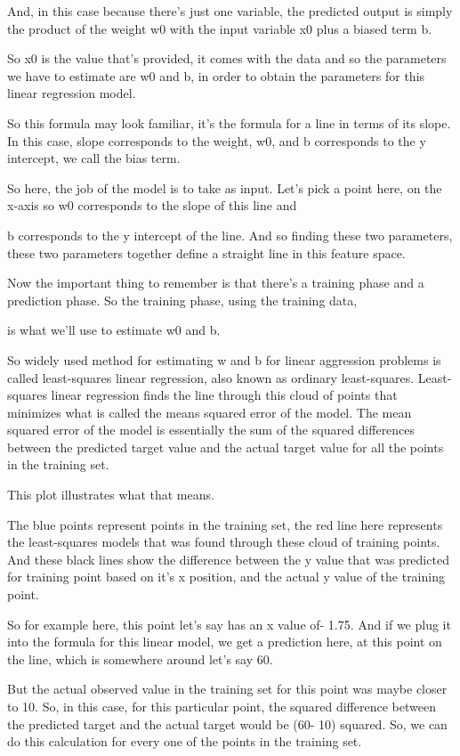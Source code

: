 \begin{multicols}{2}
And, in this case because there's just one variable, the predicted output is simply the product of the weight w0 with the input variable x0 plus a biased term b. 

So x0 is the value that's provided, it comes with the data and so the parameters we have to estimate are w0 and b, in order to obtain the parameters for this linear regression model. 

So this formula may look familiar, it's the formula for a line in terms of its slope. In this case, slope corresponds to the weight, w0, and b corresponds to the y intercept, we call the bias term. 

So here, the job of the model is to take as input. Let's pick a point here, on the x-axis so w0 corresponds to the slope of this line and 

b corresponds to the y intercept of the line. And so finding these two parameters, these two parameters together define a straight line in this feature space. 

Now the important thing to remember is that there's a training phase and a prediction phase. So the training phase, using the training data, 

is what we'll use to estimate w0 and b. 

So widely used method for estimating w and b for linear aggression problems is called least-squares linear regression, also known as ordinary least-squares. Least-squares linear regression finds the line through this cloud of points that minimizes what is called the means squared error of the model. The mean squared error of the model is essentially the sum of the squared differences between the predicted target value and the actual target value for all the points in the training set. 

This plot illustrates what that means. 

The blue points represent points in the training set, the red line here represents the least-squares models that was found through these cloud of training points. And these black lines show the difference between the y value that was predicted for training point based on it's x position, and the actual y value of the training point. 

So for example here, this point let's say has an x value of- 1.75. And if we plug it into the formula for this linear model, we get a prediction here, at this point on the line, which is somewhere around let's say 60. 

But the actual observed value in the training set for this point was maybe closer to 10. So, in this case, for this particular point, the squared difference between the predicted target and the actual target would be (60- 10) squared. So, we can do this calculation for every one of the points in the training set. 


\end{multicols}
